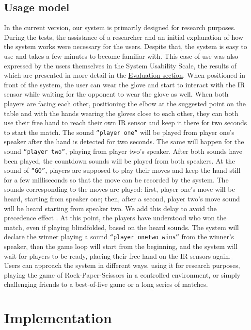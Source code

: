 \documentclass[11pt,a4paper]{report}
\begin{document}
\subsection*{Usage model}
In the current version, our system is primarily designed for research purposes. During the tests, the assistance of a researcher and an initial explanation of how the system works were necessary for the users. Despite that, the system is easy to use and takes a few minutes to become familiar with. This ease of use was also expressed by the users themselves in the System Usability Scale, the results of which are presented in more detail in the \hyperref[sec:Evaluation]{Evaluation section}.
When positioned in front of the system, the user can wear the glove and start to interact with the IR sensor while waiting for the opponent to wear the glove as well. When both players are facing each other, positioning the elbow at the suggested point on the table and with the hands wearing the gloves close to each other, they can both use their free hand to reach their own IR sensor and keep it there for two seconds to start the match. The sound \texttt{“player one”} will be played from player one’s speaker after the hand is detected for two seconds. The same will happen for the sound \texttt{“player two”}, playing from player two’s speaker. After both sounds have been played, the countdown sounds will be played from both speakers. At the sound of \texttt{“GO\!”}, players are supposed to play their moves and keep the hand still for a few milliseconds so that the move can be recorded by the system. The sounds corresponding to the moves are played: first, player one’s move will be heard, starting from speaker one; then, after a second, player two’s move sound will be heard starting from speaker two. We add this delay to avoid the precedence effect \cite*{1}. At this point, the players have understood who won the match, even if playing blindfolded, based on the heard sounds. The system will declare the winner playing a sound \texttt{“player one\/two wins”} from the winner’s speaker, then the game loop will start from the beginning, and the system will wait for players to be ready, placing their free hand on the IR sensors again.
Users can approach the system in different ways, using it for research purposes, playing the game of Rock-Paper-Scissors in a controlled environment, or simply challenging friends to a best-of-five game or a long series of matches.

\section*{Implementation}\label{sec:Implementation}
\end{document}

